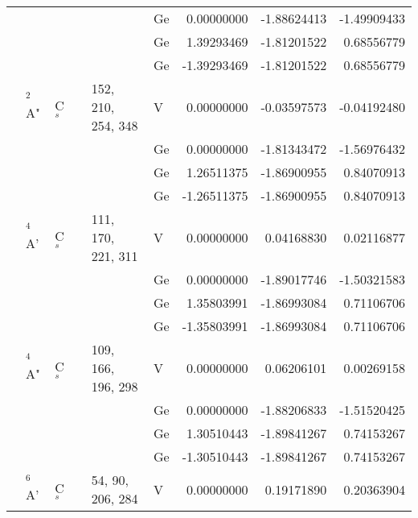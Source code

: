 \begin{center}
\begin{landscape}
\begin{longtable}{@{}clllllrrr@{}}
			        &       &      &  &                                      & Ge  &   0.00000000  &  -1.88624413  &  -1.49909433 \\
			        &       &      &  &                                      & Ge  &   1.39293469  &  -1.81201522  &   0.68556779 \\
			        &       &      &  &                                      & Ge  &  -1.39293469  &  -1.81201522  &   0.68556779 \\
	& $^2$A"        & C$_s$        &  & 152, 210, 254, 348                   & V   &   0.00000000  &  -0.03597573  &  -0.04192480 \\
			        &       &      &  &                                      & Ge  &   0.00000000  &  -1.81343472  &  -1.56976432 \\
			        &       &      &  &                                      & Ge  &   1.26511375  &  -1.86900955  &   0.84070913 \\
			        &       &      &  &                                      & Ge  &  -1.26511375  &  -1.86900955  &   0.84070913 \\
	& $^4$A' 		& C$_s$        &  & 111, 170, 221, 311                   & V   &   0.00000000  &   0.04168830  &   0.02116877 \\
			        &       &      &  &                                      & Ge  &   0.00000000  &  -1.89017746  &  -1.50321583 \\
			        &       &      &  &                                      & Ge  &   1.35803991  &  -1.86993084  &   0.71106706 \\
			        &       &      &  &                                      & Ge  &  -1.35803991  &  -1.86993084  &   0.71106706 \\
	& $^4$A" 	    & C$_s$        &  & 109, 166, 196, 298                   & V   &   0.00000000  &   0.06206101  &   0.00269158 \\
			        &       &      &  &                                      & Ge  &   0.00000000  &  -1.88206833  &  -1.51520425 \\
			        &       &      &  &                                      & Ge  &   1.30510443  &  -1.89841267  &   0.74153267 \\
			        &       &      &  &                                      & Ge  &  -1.30510443  &  -1.89841267  &   0.74153267 \\
	& $^6$A'     	& C$_s$ 	   &  & 54,  90, 206, 284                    & V   &   0.00000000  &   0.19171890  &   0.20363904 \\

\end{longtable}
\end{landscape}
\end{center}
